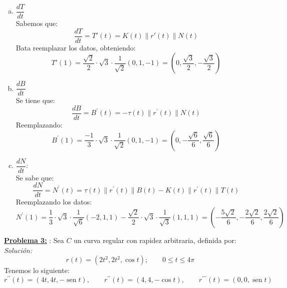 \documentclass[12pt]{article}
\newcommand{\sen}{\operatorname{sen}}
\begin{document}
\begin{enumerate}[a)]
    \item $\displaystyle\dfrac{dT}{dt}$ \\
    Sabemos que:
    \[\dfrac{dT}{dt}=T'(t)=K(t)\|r'(t)\|N(t) \]
    Bata reemplazar los datos, obteniendo:
    \[T'(1)=\dfrac{\sqrt{2}}{2}\cdot\sqrt{3}\cdot\dfrac{1}{\sqrt{2}}(0,1,-1)=(0,\dfrac{\sqrt{3}}{2},-\dfrac{\sqrt{3}}{2}) \]
    \item $\displaystyle\dfrac{dB}{dt}$\\
    Se tiene que: 
    \[\dfrac{dB}{dt}=B^{\prime}(t)=-\tau(t)\|r^{\prime}(t)\|N(t)\]
    Reemplazando:
    \[B^{\prime}(1)=\dfrac{-1}{3}\cdot\sqrt{3}\cdot\dfrac{1}{\sqrt{2}}(0,1,-1)=(0,-\dfrac{\sqrt{6}}{6},\dfrac{\sqrt{6}}{6})\]
    \item $\displaystyle\dfrac{dN}{dt}$:\\
    Se sabe que:
    \[\dfrac{dN}{dt}=N^{\prime}(t)=\tau(t)\|r^{\prime}(t)\|B(t)-K(t)\|r^{\prime}(t)\|T(t)\]
    Reemplazando los datos:
    \[N^{\prime}(1)=\dfrac{1}{3}\cdot\sqrt{3}\cdot\dfrac{1}{\sqrt{6}}(-2,1,1)-\dfrac{\sqrt{2}}{2}\cdot\sqrt{3}\cdot\dfrac{1}{\sqrt{3}}(1,1,1)=(-\dfrac{5\sqrt{2}}{6},-\dfrac{2\sqrt{2}}{6},\dfrac{2\sqrt{2}}{6})\]
\end{enumerate}
\underline{\textbf{Problema 3:}} : Sea $C$ un curva regular con rapidez arbitraria, definida por:\\
\emph{Solución:}
\[r(t)=(2t^2,2t^2,\cos t); \qquad 0\leq t \leq 4\pi \]
Tenemos lo siguiente:
\[r^{\prime\prime}(t)=(4t,4t,-\sen t), \qquad r^{\prime\prime}(t)=(4,4,-\cos t), \qquad r^{\prime\prime\prime}(t)=(0,0,\sen t)\]
\end{document}

